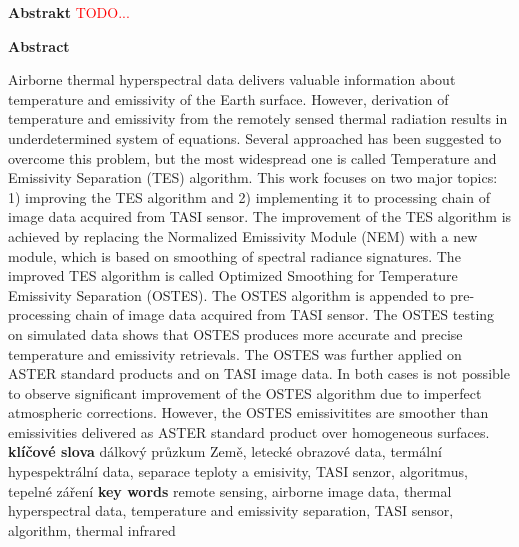 \documentclass[oneside,12pt]{book}%
\begin{document}


\newpage \hspace*{0.1cm} \thispagestyle{empty}
\newline
\noindent\textbf{Abstrakt}\newline
\textcolor{red}{TODO...}

\vspace{2cm}
\noindent\textbf{Abstract}\newline

\noindent Airborne thermal hyperspectral data delivers valuable information about temperature and emissivity of the Earth surface. However, derivation of temperature and emissivity from the remotely sensed thermal radiation results in underdetermined system of equations. Several approached has been suggested to overcome this problem, but the most widespread one is called Temperature and Emissivity Separation (TES) algorithm. This work focuses on two major topics: 1) improving the TES algorithm and 2) implementing it to processing chain of image data acquired from TASI sensor. The improvement of the TES algorithm is achieved by replacing the Normalized Emissivity Module (NEM) with a new module, which is based on smoothing of spectral radiance signatures. The improved TES algorithm is called Optimized Smoothing for Temperature Emissivity Separation (OSTES). The OSTES algorithm is appended to pre-processing chain of image data acquired from TASI sensor. The OSTES testing on simulated data shows that OSTES produces more accurate and precise temperature and emissivity retrievals. The OSTES was further applied on ASTER standard products and on TASI image data. In both cases is not possible to observe significant improvement of the OSTES algorithm due to imperfect atmospheric corrections. However, the OSTES emissivitites are smoother than emissivities delivered as ASTER standard product over homogeneous surfaces.
\newline
\newline
\newline
\textbf{klíčové slova}\newline
dálkový průzkum Země, letecké obrazové data, termální hypespektrální data, separace teploty a emisivity, TASI senzor, algoritmus, tepelné záření
\newline
\newline
\newline
\textbf{key words}\newline
remote sensing, airborne image data, thermal hyperspectral data, temperature and emissivity separation, TASI sensor, algorithm, thermal infrared
\end{document}
